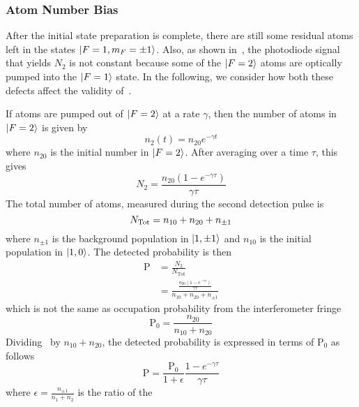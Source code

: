 \subsubsection{Atom Number Bias}\label{subsec:atom_number_bias}
After the initial state preparation is complete, there are still some
residual atoms left in the states $\ket{F=1, m_F = \pm 1}$. Also, as
shown in~, the photodiode signal that
yields $N_2$ is not constant because some of the $\ket{F=2}$ atoms are
optically pumped into the $\ket{F=1}$ state. In the following, we
consider how both these defects affect the validity
of~.
\par\noindent
If atoms are pumped out of
\(\ket{F=2}\) at a rate \(\gamma\), then the
number of atoms in $\ket{F=2}$ is given by
\begin{equation}
  n_2(t) = n_{20}e^{-\gamma t}
  \label{eq:n2_time}
\end{equation}
where \(n_{20}\) is the initial number in \(\ket{F=2}\). After
averaging over a time \(\tau\), this gives
\begin{equation}
  N_2 = \frac{n_{20} (1-e^{-\gamma \tau})}{\gamma \tau}
  \label{eq:n2_avg}
\end{equation}
The total number of atoms, measured during the second detection pulse
is
\begin{equation}
  N_\textnormal{Tot} =  n_{10} + n_{20} + n_{\pm 1}
  \label{eq:n1_avg}
\end{equation}
where \(n_{\pm 1}\) is the background population in
\(\ket{1,\pm{1}}\) and $n_{10}$ is the initial population in
$\ket{1,0}$. The detected probability is then
\begin{align}
  \text{P} &= \frac{N_2}{N_\text{Tot}} \nonumber \\
    &= \frac{\frac{n_{20} (1-e^{-\gamma \tau})}{\gamma \tau}}{n_{10} +
    n_{20} + n_{\pm 1}}
    \label{eq:prob_bias}
\end{align}
which is not the same as occupation probability from the
interferometer fringe
\begin{equation}
  \text{P}_0 = \frac{n_{20}}{n_{10} + n_{20}}
\end{equation}
Dividing~ by $n_{10}+n_{20}$, the detected
probability is expressed in terms of $\text{P}_0$ as
follows 
\begin{equation}
  \text{P} = \frac{\text{P}_0}{1+\epsilon}\frac{1-e^{-\gamma \tau}}{\gamma \tau}
\end{equation}
where \(\epsilon = \frac{n_{\pm{1}}}{n_1+n_2}\) is the ratio of the
